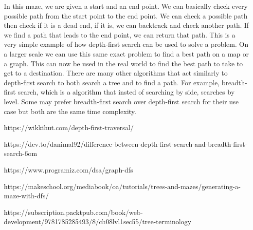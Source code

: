 \documentclass[12pt]{article}
\begin{document}
In this maze, we are given a start and an end point.
We can basically check every possible path from the start point to the end point.
We can check a possible path then check if it is a dead end, if it is, we can backtrack and check another path.
If we find a path that leads to the end point, we can return that path.
This is a very simple example of how depth-first search can be used to solve a problem.
On a larger scale we can use this same exact problem to find a best path on a map or a graph.
This can now be used in the real world to find the best path to take to get to a destination.
There are many other algorithms that act similarly to depth-first search to both search a tree and to find a path.
For example, breadth-first search, which is a algorithm that insted of searching by side, searches by level.
Some may prefer breadth-first search over depth-first search for their use case but both are the same time complexity.

\begin{thebibliography}{9}
    https://wikkihut.com/depth-first-traversal/

    https://dev.to/danimal92/difference-between-depth-first-search-and-breadth-first-search-6om

    https://www.programiz.com/dsa/graph-dfs

    https://makeschool.org/mediabook/oa/tutorials/trees-and-mazes/generating-a-maze-with-dfs/

    https://subscription.packtpub.com/book/web-development/9781785285493/8/ch08lvl1sec55/tree-terminology
    
\end{thebibliography}
\end{document}
